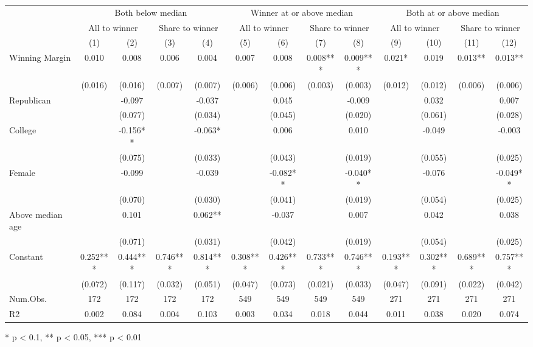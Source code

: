 \begin{table}[t]
\fontsize{12.0pt}{14.4pt}\selectfont
\begin{tabular*}{\linewidth}{@{\extracolsep{\fill}}lcccccccccccc}
\toprule
 & \multicolumn{4}{c}{Both below median} & \multicolumn{4}{c}{Winner at or above median} & \multicolumn{4}{c}{Both at or above median} \\ 
\cmidrule(lr){2-5} \cmidrule(lr){6-9} \cmidrule(lr){10-13}
 & \multicolumn{2}{c}{All to winner} & \multicolumn{2}{c}{Share to winner} & \multicolumn{2}{c}{All to winner} & \multicolumn{2}{c}{Share to winner} & \multicolumn{2}{c}{All to winner} & \multicolumn{2}{c}{Share to winner} \\ 
\cmidrule(lr){2-3} \cmidrule(lr){4-5} \cmidrule(lr){6-7} \cmidrule(lr){8-9} \cmidrule(lr){10-11} \cmidrule(lr){12-13}
  & (1) & (2) & (3) & (4) & (5) & (6) & (7) & (8) & (9) & (10) & (11) & (12) \\ 
\midrule\addlinespace[2.5pt]
Winning Margin & 0.010 & 0.008 & 0.006 & 0.004 & 0.007 & 0.008 & 0.008*** & 0.009*** & 0.021* & 0.019 & 0.013** & 0.013** \\ 
 & (0.016) & (0.016) & (0.007) & (0.007) & (0.006) & (0.006) & (0.003) & (0.003) & (0.012) & (0.012) & (0.006) & (0.006) \\ 
Republican &  & -0.097 &  & -0.037 &  & 0.045 &  & -0.009 &  & 0.032 &  & 0.007 \\ 
 &  & (0.077) &  & (0.034) &  & (0.045) &  & (0.020) &  & (0.061) &  & (0.028) \\ 
College &  & -0.156** &  & -0.063* &  & 0.006 &  & 0.010 &  & -0.049 &  & -0.003 \\ 
 &  & (0.075) &  & (0.033) &  & (0.043) &  & (0.019) &  & (0.055) &  & (0.025) \\ 
Female &  & -0.099 &  & -0.039 &  & -0.082** &  & -0.040** &  & -0.076 &  & -0.049** \\ 
 &  & (0.070) &  & (0.030) &  & (0.041) &  & (0.019) &  & (0.054) &  & (0.025) \\ 
Above median age &  & 0.101 &  & 0.062** &  & -0.037 &  & 0.007 &  & 0.042 &  & 0.038 \\ 
 &  & (0.071) &  & (0.031) &  & (0.042) &  & (0.019) &  & (0.054) &  & (0.025) \\ 
Constant & 0.252*** & 0.444*** & 0.746*** & 0.814*** & 0.308*** & 0.426*** & 0.733*** & 0.746*** & 0.193*** & 0.302*** & 0.689*** & 0.757*** \\ 
{} & {(0.072)} & {(0.117)} & {(0.032)} & {(0.051)} & {(0.047)} & {(0.073)} & {(0.021)} & {(0.033)} & {(0.047)} & {(0.091)} & {(0.022)} & {(0.042)} \\ 
Num.Obs. & 172 & 172 & 172 & 172 & 549 & 549 & 549 & 549 & 271 & 271 & 271 & 271 \\ 
R2 & 0.002 & 0.084 & 0.004 & 0.103 & 0.003 & 0.034 & 0.018 & 0.044 & 0.011 & 0.038 & 0.020 & 0.074 \\ 
\bottomrule
\end{tabular*}
\begin{minipage}{\linewidth}
* p < 0.1, ** p < 0.05, *** p < 0.01\\
\end{minipage}
\end{table}

